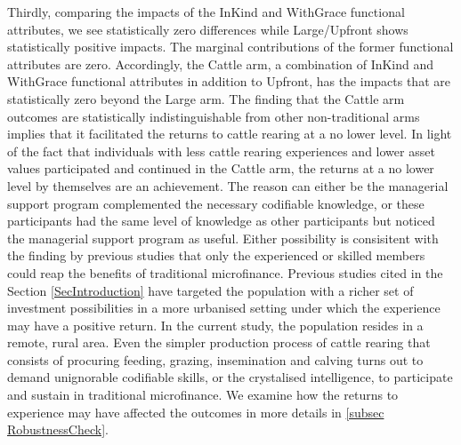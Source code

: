 	Thirdly, comparing the impacts of the \textsf{InKind} and \textsf{WithGrace} functional attributes, we see statistically zero differences while \textsf{Large/Upfront} shows statistically positive impacts. The marginal contributions of the former functional attributes are zero. Accordingly, the \textsf{Cattle} arm, a combination of \textsf{InKind} and \textsf{WithGrace} functional attributes in addition to \textsf{Upfront}, has the impacts that are statistically zero beyond the \textsf{Large} arm. The finding that the \textsf{Cattle} arm outcomes are statistically indistinguishable from other non-\textsf{traditional} arms implies that it facilitated the returns to cattle rearing at a no lower level. In light of the fact that individuals with less cattle rearing experiences and lower asset values participated and continued in the \textsf{Cattle} arm, the returns at a no lower level by themselves are an achievement. %
	The reason can either be the managerial support program complemented the necessary codifiable knowledge, or these participants had the same level of knowledge as other participants but noticed the managerial support program as useful. Either possibility is consisitent with the finding by previous studies that only the experienced or skilled members could reap the benefits of traditional microfinance. Previous studies cited in the Section \ref{SecIntroduction} have targeted the population with a richer set of investment possibilities in a more urbanised setting under which the experience may have a positive return. In the current study, the population resides in a remote, rural area. Even the simpler production process of cattle rearing that consists of procuring feeding, grazing, insemination and calving turns out to demand unignorable codifiable skills, or the crystalised intelligence, to participate and sustain in traditional microfinance. We examine how the returns to experience may have affected the outcomes in more details in \ref{subsec RobustnessCheck}.
	
